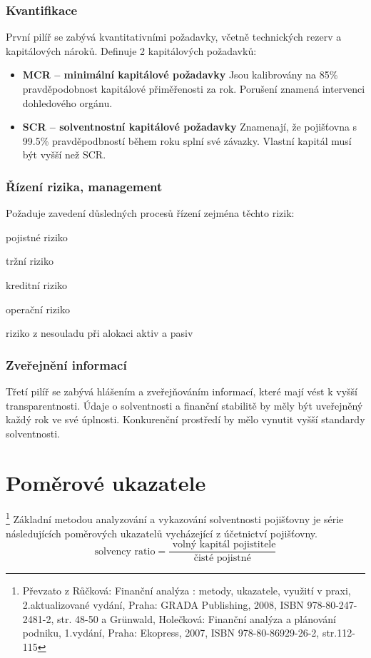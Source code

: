 \documentclass[12pt,oneside]{fithesis}
\begin{document}
\subsection{Kvantifikace}
První pilíř se zabývá kvantitativními požadavky, včetně technických rezerv a kapitálových nároků. Definuje 2 kapitálových požadavků:
\begin{itemize}
\item{\textbf{MCR -- minimální kapitálové požadavky}} Jsou kalibrovány na 85\% pravděpodobnost kapitálové přiměřenosti za rok. Porušení znamená intervenci dohledového orgánu.
\item{\textbf{SCR -- solventnostní kapitálové požadavky}} Znamenají, že pojišťovna s 99.5\% pravděpodbností během roku splní své závazky. Vlastní kapitál musí být vyšší než SCR.
\end{itemize}
\subsection{Řízení rizika, management}
Požaduje zavedení důsledných procesů řízení zejména těchto rizik:
\begin{compactitem}
\item pojistné riziko
\item tržní riziko
\item kreditní riziko
\item operační riziko
\item riziko z nesouladu při alokaci aktiv a pasiv
\end{compactitem}
\subsection{Zveřejnění informací}
Třetí pilíř se zabývá hlášením a zveřejňováním informací, které mají vést k vyšší transparentnosti. Údaje o solventnosti a finanční stabilitě by měly být uveřejněný každý rok ve své úplnosti. Konkurenční prostředí by mělo vynutit vyšší standardy solventnosti.
\chapter{Poměrové ukazatele}
\footnote{Převzato z Růčková: Finanční analýza : metody, ukazatele, využití v praxi, 2.aktualizované vydání, Praha: GRADA Publishing, 2008, ISBN 978-80-247-2481-2, str. 48-50 a Grünwald, Holečková: Finanční analýza a plánování podniku, 1.vydání, Praha: Ekopress, 2007, ISBN 978-80-86929-26-2, str.112-115} Základní metodou analyzování a vykazování solventnosti pojišťovny je série následujících
poměrových ukazatelů vycházející z účetnictví pojišťovny.
\[
	\text{solvency ratio} =\frac{\text{ volný kapitál pojistitele}}{\text{čisté pojistné}}
\]
\end{document}
